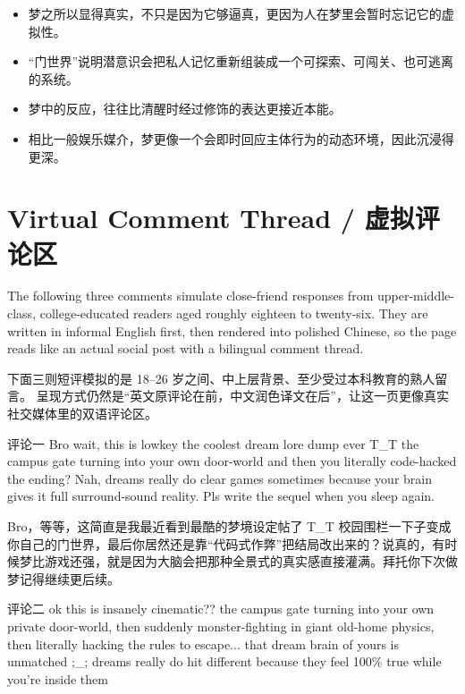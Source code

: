 \begin{translationbox}
\begin{itemize}[leftmargin=1.5em]
  \item 梦之所以显得真实，不只是因为它够逼真，更因为人在梦里会暂时忘记它的虚拟性。
  \item “门世界”说明潜意识会把私人记忆重新组装成一个可探索、可闯关、也可逃离的系统。
  \item 梦中的反应，往往比清醒时经过修饰的表达更接近本能。
  \item 相比一般娱乐媒介，梦更像一个会即时回应主体行为的动态环境，因此沉浸得更深。
\end{itemize}
\end{translationbox}

\section{Virtual Comment Thread / 虚拟评论区}

The following three comments simulate close-friend responses from upper-middle-class, college-educated readers aged roughly eighteen to twenty-six.
They are written in informal English first, then rendered into polished Chinese, so the page reads like an actual social post with a bilingual comment thread.

\begin{translationbox}
下面三则短评模拟的是 18--26 岁之间、中上层背景、至少受过本科教育的熟人留言。
呈现方式仍然是“英文原评论在前，中文润色译文在后”，让这一页更像真实社交媒体里的双语评论区。
\end{translationbox}

\begin{commentbox}{评论一}
Bro wait, this is lowkey the coolest dream lore dump ever T\_T the campus gate turning into your own door-world and then you literally code-hacked the ending? Nah, dreams really do clear games sometimes because your brain gives it full surround-sound reality. Pls write the sequel when you sleep again.
\end{commentbox}

\begin{translationbox}
Bro，等等，这简直是我最近看到最酷的梦境设定帖了 T\_T 校园围栏一下子变成你自己的门世界，最后你居然还是靠“代码式作弊”把结局改出来的？说真的，有时候梦比游戏还强，就是因为大脑会把那种全景式的真实感直接灌满。拜托你下次做梦记得继续更后续。
\end{translationbox}

\begin{commentbox}{评论二}
ok this is insanely cinematic?? the campus gate turning into your own private door-world, then suddenly monster-fighting in giant old-home physics, then literally hacking the rules to escape... that dream brain of yours is unmatched ;\_; dreams really do hit different because they feel 100\% true while you're inside them
\end{commentbox}

